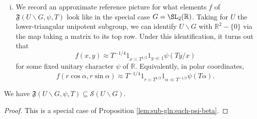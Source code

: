 \begin{remark}
\begin{enumerate}[(i)]
  \item
    We record an approximate reference picture for what elements $f$ of $\mathfrak{F}(U \backslash G, \psi, T)$ look like in the special case $G = \SL_2(\mathbb{R})$.    Taking for $U$ the lower-triangular unipotent subgroup, we can identify $U \backslash G$ with $\mathbb{R}^2 - \{0\}$ via the map taking a matrix to its top row.  Under this identification, it turns out that
    \begin{equation*}
      f(x,y) \approx
      T^{-1/4}
      1_{x \asymp T^{1/2}}
      1_{y \ll 1}
      \psi(T y/x)
    \end{equation*}
    for some fixed unitary character $\psi$ of $\mathbb{R}$.  Equivalently, in polar coordinates,
    \begin{equation*}
      f(r \cos \alpha, r \sin \alpha) \approx
      T^{-1/4} 1_{r \asymp T^{1/2}}
      1 _{\alpha \ll T^{-1/2}} \psi(T \alpha).
    \end{equation*}
  \end{enumerate}
\end{remark}


\begin{lemma}\label{lem:standard2:mathfr-backsl-g}
  We have $\mathfrak{F}(U \backslash G, \psi, T) \subseteq \mathcal{S}(U \backslash G)$.
\end{lemma}
\begin{proof}
  This is a special case of Proposition \ref{lem:sub-gln:each-psi-beta}.
\end{proof}

